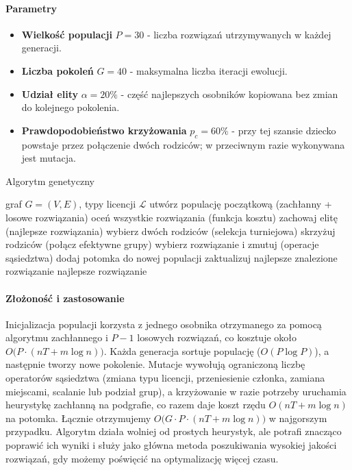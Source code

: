 \paragraph{Parametry}
\begin{itemize}
  \item \textbf{Wielkość populacji} $P=30$ - liczba rozwiązań utrzymywanych w każdej generacji.
  \item \textbf{Liczba pokoleń} $G=40$ - maksymalna liczba iteracji ewolucji.
  \item \textbf{Udział elity} $\alpha=20\%$ - część najlepszych osobników kopiowana bez zmian do kolejnego pokolenia.
  \item \textbf{Prawdopodobieństwo krzyżowania} $p_c=60\%$ - przy tej szansie dziecko powstaje przez połączenie dwóch rodziców; w przeciwnym razie wykonywana jest mutacja.
\end{itemize}

\begin{algorithm}[H]
  \caption{Algorytm genetyczny}
  \label{alg:ga}
  \begin{algorithmic}[1]
    \Require graf $G=(V,E)$, typy licencji $\mathcal{L}$
    \State utwórz populację początkową (zachłanny + losowe rozwiązania)
    \State oceń wszystkie rozwiązania (funkcja kosztu)
    \State zachowaj elitę (najlepsze rozwiązania)
    \State wybierz dwóch rodziców (selekcja turniejowa)
    \State skrzyżuj rodziców (połącz efektywne grupy)
    \Else
    \State wybierz rozwiązanie i zmutuj (operacje sąsiedztwa)
    \EndIf
    \State dodaj potomka do nowej populacji
    \EndWhile
    \State zaktualizuj najlepsze znalezione rozwiązanie
    \EndFor
    \State \Return najlepsze rozwiązanie
  \end{algorithmic}
\end{algorithm}

\paragraph{Złożoność i zastosowanie}
Inicjalizacja populacji korzysta z jednego osobnika otrzymanego za pomocą algorytmu zachłannego i $P-1$ losowych rozwiązań, co kosztuje około $O\bigl(P \cdot (nT + m\log n)\bigr)$. Każda generacja sortuje populację ($O(P\log P)$), a następnie tworzy nowe pokolenie. Mutacje wywołują ograniczoną liczbę operatorów sąsiedztwa (zmiana typu licencji, przeniesienie członka, zamiana miejscami, scalanie lub podział grup), a krzyżowanie w razie potrzeby uruchamia heurystykę zachłanną na podgrafie, co razem daje koszt rzędu $O(nT + m\log n)$ na potomka. Łącznie otrzymujemy $O\bigl(G \cdot P \cdot (nT + m\log n)\bigr)$ w najgorszym przypadku. Algorytm działa wolniej od prostych heurystyk, ale potrafi znacząco poprawić ich wyniki i służy jako główna metoda poszukiwania wysokiej jakości rozwiązań, gdy możemy poświęcić na optymalizację więcej czasu.



